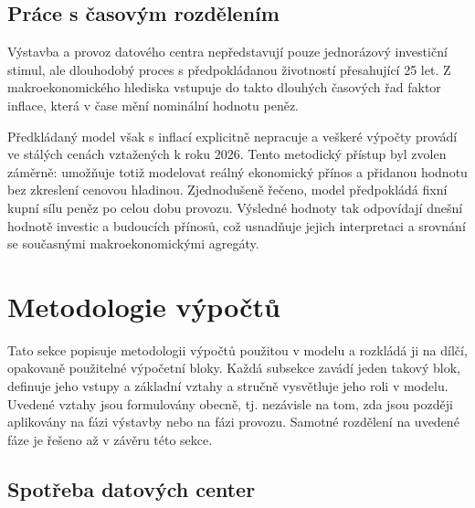 \subsection{Práce s časovým rozdělením}
\label{subsec:model_cas}

Výstavba a provoz datového centra nepředstavují pouze jednorázový investiční stimul, ale dlouhodobý proces s předpokládanou životností přesahující 25 let. Z makroekonomického hlediska vstupuje do takto dlouhých časových řad faktor inflace, která v čase mění nominální hodnotu peněz.

Předkládaný model však s inflací explicitně nepracuje a veškeré výpočty provádí ve stálých cenách vztažených k roku 2026. Tento metodický přístup byl zvolen záměrně: umožňuje totiž modelovat reálný ekonomický přínos a přidanou hodnotu bez zkreslení cenovou hladinou. Zjednodušeně řečeno, model předpokládá fixní kupní sílu peněz po celou dobu provozu. Výsledné hodnoty tak odpovídají dnešní hodnotě investic a budoucích přínosů, což usnadňuje jejich interpretaci a srovnání se současnými makroekonomickými agregáty.

\section{Metodologie výpočtů}
\label{sec:model_metodologie}


Tato sekce popisuje metodologii výpočtů použitou v modelu a rozkládá ji na dílčí, opakovaně použitelné výpočetní bloky. Každá subsekce zavádí jeden takový blok, definuje jeho vstupy a základní vztahy a stručně vysvětluje jeho roli v modelu. Uvedené vztahy jsou formulovány obecně, tj. nezávisle na tom, zda jsou později aplikovány na fázi výstavby nebo na fázi provozu. Samotné rozdělení na uvedené fáze je řešeno až v závěru této sekce.

\subsection{Spotřeba datových center}
\label{subsec:model_spotreba}

